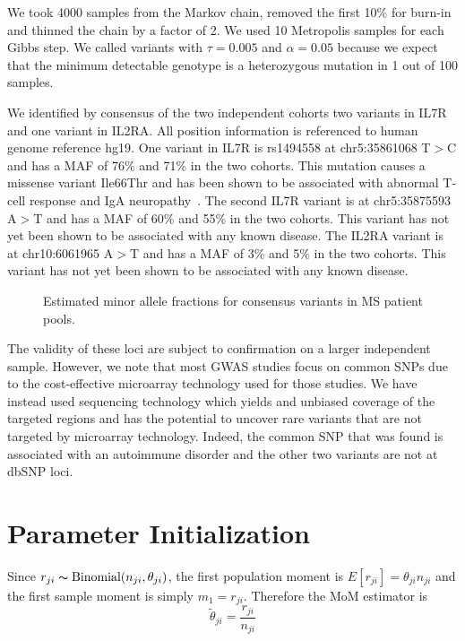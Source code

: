 \documentclass[11pt,reqno]{amsart}
\begin{document}
We took 4000 samples from the Markov chain, removed the first 10\% for burn-in and thinned the chain by a factor of 2. We used 10 Metropolis samples for each Gibbs step. We called variants with $\tau = 0.005$ and $\alpha = 0.05$ because we expect that the minimum detectable genotype is a heterozygous mutation in 1 out of 100 samples. 

We identified by consensus of the two independent cohorts two variants in IL7R and one variant in IL2RA. All position information is referenced to human genome reference hg19. One variant in IL7R is rs1494558 at chr5:35861068 T$>$C and has a MAF of 76\% and 71\% in the two cohorts. This mutation causes a missense variant Ile66Thr and has been shown to be associated with abnormal T-cell response and IgA neuropathy~\cite{HahnCho2011}. The second IL7R variant is at chr5:35875593 A$>$T and has a MAF of 60\% and 55\% in the two cohorts. This variant has not yet been shown to be associated with any known disease. The IL2RA variant is at chr10:6061965 A$>$T and has a MAF  of 3\% and 5\% in the two cohorts. This variant has not yet been shown to be associated with any known disease.

\begin{figure}[h]
\begin{center}
\caption{Estimated minor allele fractions for consensus variants in MS patient pools.}
\label{fig:MS_MAF}
\end{center}
\end{figure}

The validity of these loci are subject to confirmation on a larger independent sample. However, we note that most GWAS studies focus on common SNPs due to the cost-effective microarray technology used for those studies. We have instead used sequencing technology which yields and unbiased coverage of the targeted regions and has the potential to uncover rare variants that are not targeted by microarray technology. Indeed, the common SNP that was found is associated with an autoimmune disorder and the other two variants are not at dbSNP loci.

\appendix
\section{Parameter Initialization}\label{sec:appendix_mom}
Since $r_{ji} \thicksim \text{Binomial}(n_{ji}, \theta_{ji})$, the first population moment is  $E[r_{ji}] = \theta_{ji} n_{ji}$ and the first sample moment is simply $m_1 = r_{ji}$. Therefore the MoM estimator is 
\begin{equation}
	\tilde{\theta}_{ji} = \frac{r_{ji}} {n_{ji}}
\end{equation}
\end{document}
